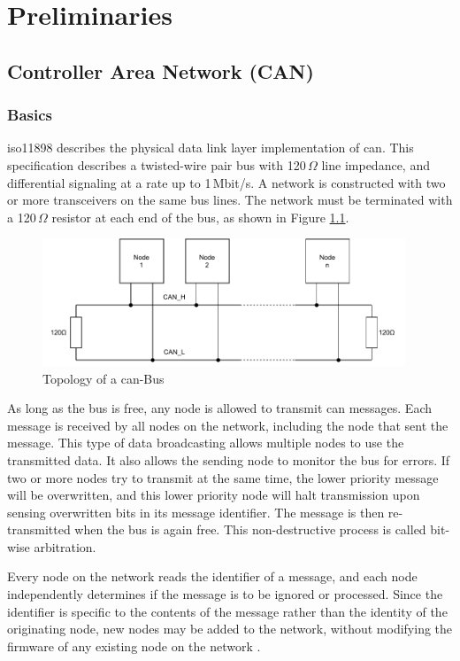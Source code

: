 \chapter{Preliminaries}
\section{Controller Area Network (CAN)}
\subsection{Basics}
\acrshort{iso}11898 describes the physical data link layer implementation of \acrshort{can}. This specification describes a twisted-wire pair bus with 120\,$\Omega$ line impedance, and differential signaling at a rate up to 1\,Mbit/s. A network is constructed with two or more transceivers on the same bus lines. The network must be terminated with a 120\,$\Omega$ resistor at each end of the bus, as shown in Figure \ref{fig:can-bus_topology}.

\begin{figure}[h!]
	\centering
	\includegraphics[height=3.8cm]{images/can-bus_topology}
	\caption{Topology of a \acrshort{can}-Bus}
	\label{fig:can-bus_topology}
\end{figure}

As long as the bus is free, any node is allowed to transmit \acrshort{can} messages. Each message is received by all nodes on the network, including the node that sent the message. This type of data broadcasting allows multiple nodes to use the transmitted data. It also allows the sending node to monitor the bus for errors. If two or more nodes try to transmit at the same time, the lower priority message will be overwritten, and this lower priority node will halt transmission upon sensing overwritten bits in its message identifier. The message is then re-transmitted when the bus is again free. This non-destructive process is called bit-wise arbitration.

Every node on the network reads the identifier of a message, and each node independently determines if the message is to be ignored or processed. Since the identifier is specific to the contents of the message rather than the identity of the originating node, new nodes may be added to the network, without modifying the firmware of any existing node on the network \cite{ti_can_transceivers}.
\newpage

